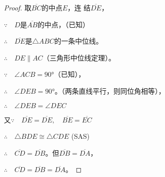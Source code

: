 \begin{proof}
    取$\overline{BC}$的中点$E$，连
    结$\overline{DE}$，

$\because\quad D$是$\overline{AB}$的中点，（已知）

$\therefore\quad  \overline{DE}$是$\triangle ABC$的一条中位线。

$\therefore\quad DE\parallel AC$（三角形中位线定理）。

$\because\quad \angle ACB=\ang{90}$（已知），

$\therefore\quad \angle DEB=\ang{90}$。（两条直线平行，则同位角相等），

$\therefore\quad \angle DEB=\angle DEC$
    
又$\because\quad  \overline{DE}=\overline{DE},\quad \overline{BE}=\overline{EC}$

$\therefore\quad \triangle BDE\cong \triangle CDE$ (SAS)

$\therefore\quad \overline{CD}=\overline{DB}$。但$\overline{DB}=\overline{DA}$，

$\therefore\quad \overline{CD}=\overline{DB}=\overline{DA}$。
\end{proof}

\begin{figure}
    \begin{minipage}[t]{0.48\linewidth}
    \centering
\begin{tikzpicture}[>=latex, scale=1]
    \end{tikzpicture}
    \caption{}
    \end{minipage}
    \begin{minipage}[t]{0.48\linewidth}
    \centering
    \begin{tikzpicture}[>=latex, scale=1.2]
    \end{tikzpicture}
    \caption{}
    \end{minipage}
    \end{figure}

